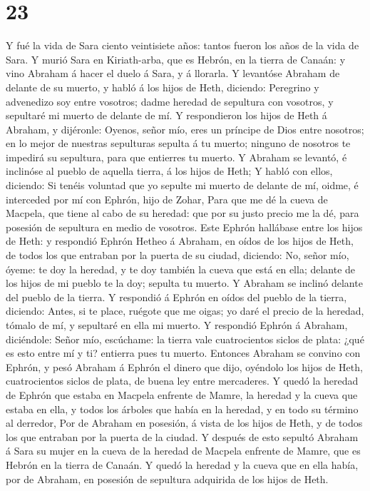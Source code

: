 \hypertarget{section-22}{%
\section{23}\label{section-22}}

 Y fué la vida de Sara ciento veintisiete años: tantos
fueron los años de la vida de Sara.  Y murió Sara en
Kiriath-arba, que es Hebrón, en la tierra de Canaán: y vino Abraham á
hacer el duelo á Sara, y á llorarla.  Y levantóse Abraham de
delante de su muerto, y habló á los hijos de Heth, diciendo:
 Peregrino y advenedizo soy entre vosotros; dadme heredad de
sepultura con vosotros, y sepultaré mi muerto de delante de mí.
 Y respondieron los hijos de Heth á Abraham, y dijéronle:
 Oyenos, señor mío, eres un príncipe de Dios entre nosotros;
en lo mejor de nuestras sepulturas sepulta á tu muerto; ninguno de
nosotros te impedirá su sepultura, para que entierres tu muerto.
 Y Abraham se levantó, é inclinóse al pueblo de aquella
tierra, á los hijos de Heth;  Y habló con ellos, diciendo:
Si tenéis voluntad que yo sepulte mi muerto de delante de mí, oidme, é
interceded por mí con Ephrón, hijo de Zohar,  Para que me dé
la cueva de Macpela, que tiene al cabo de su heredad: que por su justo
precio me la dé, para posesión de sepultura en medio de vosotros.
 Este Ephrón hallábase entre los hijos de Heth: y respondió
Ephrón Hetheo á Abraham, en oídos de los hijos de Heth, de todos los que
entraban por la puerta de su ciudad, diciendo:  No, señor
mío, óyeme: te doy la heredad, y te doy también la cueva que está en
ella; delante de los hijos de mi pueblo te la doy; sepulta tu muerto.
 Y Abraham se inclinó delante del pueblo de la tierra.
 Y respondió á Ephrón en oídos del pueblo de la tierra,
diciendo: Antes, si te place, ruégote que me oigas; yo daré el precio de
la heredad, tómalo de mí, y sepultaré en ella mi muerto.  Y
respondió Ephrón á Abraham, diciéndole:  Señor mío,
escúchame: la tierra vale cuatrocientos siclos de plata: ¿qué es esto
entre mí y ti? entierra pues tu muerto.  Entonces Abraham
se convino con Ephrón, y pesó Abraham á Ephrón el dinero que dijo,
oyéndolo los hijos de Heth, cuatrocientos siclos de plata, de buena ley
entre mercaderes.  Y quedó la heredad de Ephrón que estaba
en Macpela enfrente de Mamre, la heredad y la cueva que estaba en ella,
y todos los árboles que había en la heredad, y en todo su término al
derredor,  Por de Abraham en posesión, á vista de los hijos
de Heth, y de todos los que entraban por la puerta de la ciudad.
 Y después de esto sepultó Abraham á Sara su mujer en la
cueva de la heredad de Macpela enfrente de Mamre, que es Hebrón en la
tierra de Canaán.  Y quedó la heredad y la cueva que en
ella había, por de Abraham, en posesión de sepultura adquirida de los
hijos de Heth.

